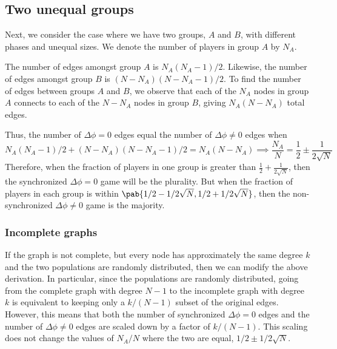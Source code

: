 \subsection{Two unequal groups}
\label{sec:two_unequal_groups}
Next, we consider the case where we have two groups, $A$ and $B$,
with different phases and unequal sizes.
We denote the number of players in group $A$ by $N_A$.

The number of edges amongst group $A$ is $N_A (N_A - 1)/2$.
Likewise, the number of edges amongst group $B$ is
$(N-N_A) (N - N_A - 1)/2$.
To find the number of edges between groups $A$ and $B$,
we observe that each of the $N_A$ nodes in group $A$
connects to each of the $N - N_A$ nodes in group $B$,
giving $N_A (N - N_A)$ total edges.

Thus, the number of $\Delta \phi = 0$ edges
equal the number of $\Delta \phi \neq 0$ edges when
\begin{equation*}
  N_A (N_A - 1)/2 + (N - N_A) (N - N_A - 1)/2 = N_A (N - N_A)
  \implies \frac{N_A}{N} = \frac{1}{2} \pm \frac{1}{2 \sqrt{N}}
\end{equation*}
Therefore, when the fraction of players in one group is greater than
$\frac{1}{2} + \frac{1}{2\sqrt{N}}$,
then the synchronized $\Delta \phi = 0$ game will be the plurality.
But when the fraction of players in each group is within
$\pab{1/2 - 1/2\sqrt{N}, 1/2 + 1/2\sqrt{N}}$,
then the non-synchronized $\Delta \phi \neq 0$ game is the majority.

\subsubsection{Incomplete graphs}
\label{sec:two_unequal_groups_incomplete}
If the graph is not complete,
but every node has approximately the same degree $k$
and the two populations are randomly distributed,
then we can modify the above derivation.
In particular, since the populations are randomly distributed,
going from the complete graph with degree $N-1$
to the incomplete graph with degree $k$
is equivalent to keeping only a $k/(N-1)$ subset
of the original edges.
However, this means that both the number
of synchronized $\Delta \phi = 0$ edges
and the number of $\Delta \phi \neq 0$ edges
are scaled down by a factor of $k/(N-1)$.
This scaling does not change the values of $N_A/N$
where the two are equal, \ie $1/2 \pm 1/2\sqrt{N}$.
